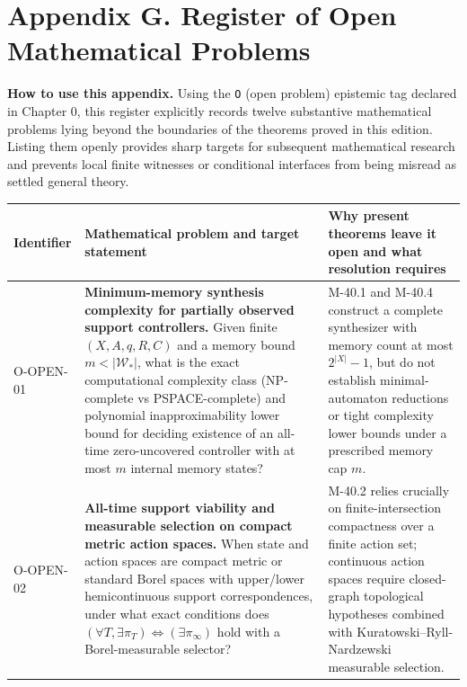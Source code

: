 \documentclass[
  english,
  11pt,
  oneside]{book}
\newcounter{none} %
\begin{document}
\chapter{Appendix G. Register of Open Mathematical Problems}\label{appendix-g}

\textbf{How to use this appendix.} Using the \texttt{O} (open problem) epistemic tag declared in Chapter 0, this register explicitly records twelve substantive mathematical problems lying beyond the boundaries of the theorems proved in this edition. Listing them openly provides sharp targets for subsequent mathematical research and prevents local finite witnesses or conditional interfaces from being misread as settled general theory.

{\def\LTcaptype{none} %
\begin{longtable}[]{@{}
  >{\raggedright\arraybackslash}p{}
  >{\raggedright\arraybackslash}p{}
  >{\raggedright\arraybackslash}p{}@{}}
\toprule\noalign{}
\begin{minipage}[b]{\linewidth}\raggedright
Identifier
\end{minipage} & \begin{minipage}[b]{\linewidth}\raggedright
Mathematical problem and target statement
\end{minipage} & \begin{minipage}[b]{\linewidth}\raggedright
Why present theorems leave it open and what resolution requires
\end{minipage} \\
\midrule\noalign{}
\endhead
\bottomrule\noalign{}
\endlastfoot
O-OPEN-01 & \textbf{Minimum-memory synthesis complexity for partially observed support controllers.} Given finite \((X,A,q,R,C)\) and a memory bound \(m<|\mathcal W_*|\), what is the exact computational complexity class (NP-complete vs PSPACE-complete) and polynomial inapproximability lower bound for deciding existence of an all-time zero-uncovered controller with at most \(m\) internal memory states? & M-40.1 and M-40.4 construct a complete synthesizer with memory count at most \(2^{|X|}-1\), but do not establish minimal-automaton reductions or tight complexity lower bounds under a prescribed memory cap \(m\). \\
O-OPEN-02 & \textbf{All-time support viability and measurable selection on compact metric action spaces.} When state and action spaces are compact metric or standard Borel spaces with upper/lower hemicontinuous support correspondences, under what exact conditions does \((\forall T,\exists\pi_T)\iff(\exists\pi_\infty)\) hold with a Borel-measurable selector? & M-40.2 relies crucially on finite-intersection compactness over a finite action set; continuous action spaces require closed-graph topological hypotheses combined with Kuratowski--Ryll-Nardzewski measurable selection. \\

\end{longtable}}
\end{document}
